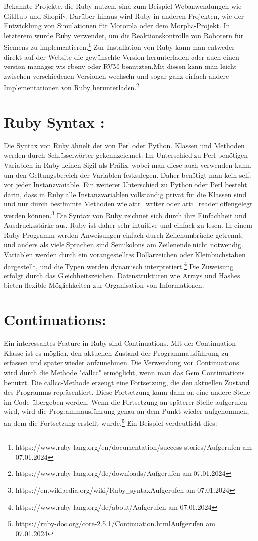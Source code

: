 \documentclass{article}
\begin{document}
Bekannte Projekte, die Ruby nutzen, sind zum Beispiel Webanwendungen wie GitHub und Shopify. Darüber hinaus wird Ruby in anderen Projekten, wie der Entwicklung von Simulationen für Motorola oder dem Morpha-Projekt. In letzterem wurde Ruby verwendet, um die Reaktionskontrolle von Robotern für Siemens zu implementieren.\footnote{https://www.ruby-lang.org/en/documentation/success-stories/Aufgerufen am 07.01.2024}
Zur Installation von Ruby kann man entweder direkt auf der Website die gewünschte Version herunterladen oder auch einen version manager wie rbenv oder RVM benutzten.Mit diesen kann man leicht zwischen verschiedenen Versionen wechseln und sogar ganz einfach andere Implementationen von Ruby herunterladen.\footnote{https://www.ruby-lang.org/de/downloads/Aufgerufen am 07.01.2024}
\section*{
Ruby Syntax :}

Die Syntax von Ruby ähnelt der von Perl oder Python. Klassen und Methoden werden durch Schlüsselwörter gekennzeichnet. Im Unterschied zu Perl benötigen Variablen in Ruby keinen Sigil als Präfix, wobei man diese auch verwenden kann, um den Geltungsbereich der Variablen festzulegen. Daher benötigt man kein self. vor jeder Instanzvariable.
Ein weiterer Unterschied zu Python oder Perl besteht darin, dass in Ruby alle Instanzvariablen vollständig privat für die Klassen sind und nur durch bestimmte Methoden wie attr\_writer oder attr\_reader offengelegt werden können.\footnote{https://en.wikipedia.org/wiki/Ruby\_syntaxAufgerufen am 07.01.2024}
Die Syntax von Ruby zeichnet sich durch ihre Einfachheit und Ausdrucksstärke aus. Ruby ist daher sehr intuitive und einfach zu lesen. In einem Ruby-Programm werden Anweisungen einfach durch Zeilenumbrüche getrennt, und anders als viele Sprachen sind Semikolons am Zeilenende nicht notwendig.
Variablen werden durch ein vorangestelltes Dollarzeichen oder Kleinbuchstaben dargestellt, und die Typen werden dynamisch interpretiert.\footnote{https://www.ruby-lang.org/de/about/Aufgerufen am 07.01.2024} Die Zuweisung erfolgt durch das Gleichheitszeichen. Datenstrukturen wie Arrays und Hashes bieten flexible Möglichkeiten zur Organisation von Informationen.
\section*{ Continuations:}
Ein interessantes Feature in Ruby sind Continuations. Mit der Continuation-Klasse ist es möglich, den aktuellen Zustand der Programmausführung zu erfassen und später wieder aufzunehmen. Die Verwendung von Continuations wird durch die Methode "callcc" ermöglicht, wenn man das Gem Continuations benutzt. Die callcc-Methode erzeugt eine Fortsetzung, die den aktuellen Zustand des Programms repräsentiert. Diese Fortsetzung kann dann an eine andere Stelle im Code übergeben werden. Wenn die Fortsetzung an späterer Stelle aufgerufen wird, wird die Programmausführung genau an dem Punkt wieder aufgenommen, an dem die Fortsetzung erstellt wurde.\footnote{https://ruby-doc.org/core-2.5.1/Continuation.htmlAufgerufen am 07.01.2024} Ein Beispiel verdeutlicht dies: \\ 
\end{document}
